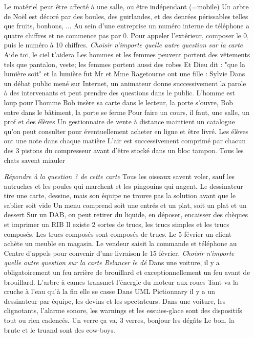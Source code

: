 \newrow
\umlpiccard
{\challenge Le matériel peut être affecté à une salle, ou être  indépendant (=mobile)
}
{Un arbre de Noël est décoré par des boules, des guirlandes, et des denrées périssables telles que fruits, bonbons, ...
}
{Au sein d'une entreprise un numéro interne de téléphone a quatre chiffres et ne commence pas par 0. Pour appeler l'extérieur, composer le 0, puis le numéro  à 10 chiffres.
}
{\challenge \emph{Choisir n'importe quelle autre question sur la carte}
}
\umlpiccard
{\challenge Aide toi, le ciel t'aidera 
}
{Les hommes et les femmes peuvent portent des vêtements tels que pantalon, veste; les femmes portent aussi des robes
}
{Et Dieu dit : "que la lumière soit" et la lumière fut
}
{\challenge Mr et Mme Ragetourne ont une fille : Sylvie
}
\umlpiccard
{Dans un débat public mené sur Internet, un animateur donne successivement la parole à des intervenants et peut prendre des questions dans le public.
}
{\challenge L'homme est loup pour l'homme
}
{Bob insère sa carte dans le lecteur, la porte s'ouvre, Bob entre dans le bâtiment, la porte se ferme
}
{Pour faire un cours, il faut, une salle, un prof et des élèves
}
\umlpiccard
{Un gestionnaire de vente à distance maintient un catalogue qu'on peut consulter pour éventuellement acheter en ligne et être livré.
}
{Les élèves ont une note dans chaque matière
}
{\challenge L'air est successivement comprimé par chacun des 3 pistons du compresseur avant d'être stocké dans un bloc tampon.
}
{\challenge Tous les chats savent miauler
}

\newrow
\umlpiccard
{\emph{Répondre à la question ? de cette carte} 
}
{\challenge Tous les oiseaux savent voler, sauf les autruches et les poules qui marchent et les pingouins qui nagent.
}
{Le dessinateur tire une carte, dessine, mais son équipe ne trouve pas la solution avant que le sablier soit vide
}
{Un menu comprend soit une entrés et un plat, soit un plat et un dessert
}
\umlpiccard
{Sur un DAB, on peut retirer du liquide, en déposer, encaisser des chèques et imprimer un RIB
}
{Il existe 2 sortes de trucs, les trucs simples et les trucs composés. Les trucs composés sont composés de trucs.
}
{Le 5 février un client achète un meuble en magasin. Le vendeur saisit la commande et téléphone au Centre d'appels pour convenir d'une livraison le 15 février.
}
{\emph{Choisir n'importe quelle autre question sur la carte}
}
\umlpiccard
{\emph{Relancer le dé}
}
{Dans une voiture, il y a obligatoirement un feu arrière de brouillard et exceptionnellement un feu avant de brouillard.
}
{\challenge L'arbre à cames transmet l'énergie du moteur aux roues
}
{\challenge Tant va la cruche à l'eau qu'à la fin elle se casse
}
\umlpiccard
{\challenge Dans UML Pictionnary il y a un dessinateur par équipe, les devins et les spectateurs.
}
{\challenge Dans une voiture, les clignotants, l'alarme sonore, les warnings et les essuies-glace sont des dispositifs tout ou rien cadencés.
}
{\challenge Un verre ça va, 3 verres, bonjour les dégâts
}
{Le bon, la brute et le truand sont des cow-boys.
}

